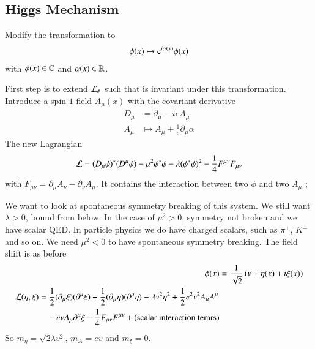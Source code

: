 \subsection{Higgs Mechanism}
Modify the transformation to
   \begin{align*}
   \phi(x) \mapsto \mathrm{e}^{i\alpha(x)} \phi(x)
\end{align*}
with $\phi(x) \in \mathbb{C}$ and $\alpha(x) \in \mathbb{R}$.

First step is to extend $\mathcal{L}_\phi$ such that is invariant under this transformation. Introduce a spin-$1$ field $A_\mu(x)$ with the covariant derivative
\begin{align*}
   D_\mu &= \partial_\mu - ieA_\mu \\
   A_\mu &\mapsto A_\mu + \frac{1}{e} \partial_\mu \alpha
\end{align*}
The new Lagrangian
\begin{align}
   \mathcal{L} = (D_\mu \phi)^* (D^\mu \phi) - \mu^2 \phi^* \phi - \lambda (\phi^* \phi)^2 - \frac{1}{4} F^{\mu\nu}F_{\mu\nu}
\end{align}
with $F_{\mu\nu}=\partial_\mu A_\nu - \partial_\nu A_\mu$. It contains the interaction between two $\phi$ and two $A_\mu$ ;



We want to look at spontaneous symmetry breaking of this system. We still want $\lambda > 0$, bound from below. In the case of $\mu^2 > 0$, symmetry not broken and we have scalar QED. In particle physics we do have charged scalars, such as $\pi^{\pm}$, $K^{\pm}$ and so on. We need $\mu^2 < 0$ to have spontaneous symmetry breaking. The field shift is as before
\begin{align}
   \phi(x) &= \frac{1}{\sqrt{2}} \left( v + \eta (x) + i \xi (x) \right) \\
   \begin{split}
   \mathcal{L}(\eta, \xi) &= \frac{1}{2} (\partial_\mu \xi) (\partial^\mu \xi) + \frac{1}{2} (\partial_\mu \eta) (\partial^\mu \eta) - \lambda v^2 \eta^2 + \frac{1}{2} e^2 v^2 A_\mu A^\mu \\ 
                   &\quad - ev A_\mu \partial^\mu \xi - \frac{1}{4}F_{\mu\nu}F^{\mu\nu}  + (\text{scalar interaction temrs})
   \end{split}
\end{align}
So $m_\eta = \sqrt{2\lambda v^2}$, $m_A = ev$ and $m_\xi = 0$.

